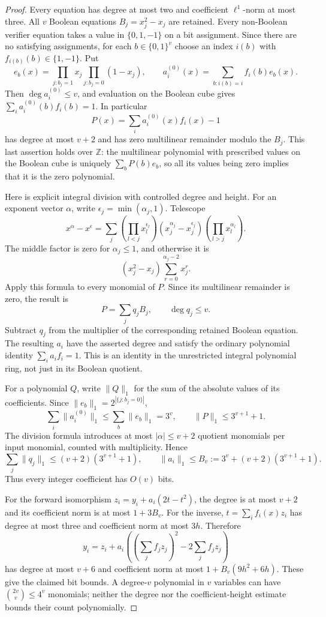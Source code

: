 \begin{proof}
Every equation has degree at most two and coefficient $\ell^1$-norm
at most three. All $v$ Boolean equations $B_j=x_j^2-x_j$ are retained.
Every non-Boolean verifier equation takes a value in $\{0,1,-1\}$
on a bit assignment. Since there are no satisfying assignments,
for each $b\in\{0,1\}^v$ choose an index $i(b)$ with
$f_{i(b)}(b)\in\{1,-1\}$. Put
\[
 e_b(x)=\prod_{j:b_j=1}x_j\prod_{j:b_j=0}(1-x_j),
 \qquad
 a_i^{(0)}(x)=\sum_{b:i(b)=i}f_i(b)e_b(x).
\]
Then $\deg a_i^{(0)}\leq v$, and evaluation on the Boolean cube gives
$\sum_i a_i^{(0)}(b)f_i(b)=1$. In particular
\[
 P(x)=\sum_i a_i^{(0)}(x)f_i(x)-1
\]
has degree at most $v+2$ and has zero multilinear remainder modulo
the $B_j$. This last assertion holds over $\mathbb Z$: the
multilinear polynomial with prescribed values on the Boolean cube
is uniquely $\sum_b P(b)e_b$, so all its values being zero implies
that it is the zero polynomial.

Here is explicit integral division with controlled degree and
height. For an exponent vector $\alpha$, write
$\epsilon_j=\min(\alpha_j,1)$. Telescope
\[
 x^\alpha-x^\epsilon=
 \sum_j\left(\prod_{l<j}x_l^{\epsilon_l}\right)
       (x_j^{\alpha_j}-x_j^{\epsilon_j})
       \left(\prod_{l>j}x_l^{\alpha_l}\right).
\]
The middle factor is zero for $\alpha_j\leq1$, and otherwise it is
\[
        (x_j^2-x_j)\sum_{r=0}^{\alpha_j-2}x_j^r.
\]
Apply this formula to every monomial of $P$. Since its multilinear
remainder is zero, the result is
\[
                         P=\sum_j q_j B_j,
 \qquad \deg q_j\leq v.
\]
Subtract $q_j$ from the multiplier of the corresponding retained
Boolean equation. The resulting $a_i$ have the asserted degree
and satisfy the ordinary polynomial identity $\sum_i a_i f_i=1$.
This is an identity in the unrestricted integral polynomial ring,
not just in its Boolean quotient.

For a polynomial $Q$, write $\|Q\|_1$ for the sum of the absolute
values of its coefficients. Since $\|e_b\|_1=2^{|\{j:b_j=0\}|}$,
\[
 \sum_i\|a_i^{(0)}\|_1\leq\sum_b\|e_b\|_1=3^v,
 \qquad \|P\|_1\leq3^{v+1}+1.
\]
The division formula introduces at most $|\alpha|\leq v+2$
quotient monomials per input monomial, counted with multiplicity.
Hence
\[
 \sum_j\|q_j\|_1\leq(v+2)(3^{v+1}+1),\qquad
 \|a_i\|_1\leq B_v:=3^v+(v+2)(3^{v+1}+1).
\]
Thus every integer coefficient has $O(v)$ bits.

For the forward isomorphism $z_i=y_i+a_i(2t-t^2)$, the degree is
at most $v+2$ and its coefficient norm is at most $1+3B_v$.
For the inverse, $t=\sum_i f_i(x)z_i$ has degree at most three and
coefficient norm at most $3h$. Therefore
\[
 y_i=z_i+a_i\left(\left(\sum_j f_jz_j\right)^2
                           -2\sum_j f_jz_j\right)
\]
has degree at most $v+6$ and coefficient norm at most
$1+B_v(9h^2+6h)$. These give the claimed bit bounds.
A degree-$v$ polynomial in $v$ variables can have
$\binom{2v}{v}\leq4^v$ monomials; neither the degree nor the
coefficient-height estimate bounds their count polynomially.
\end{proof}

